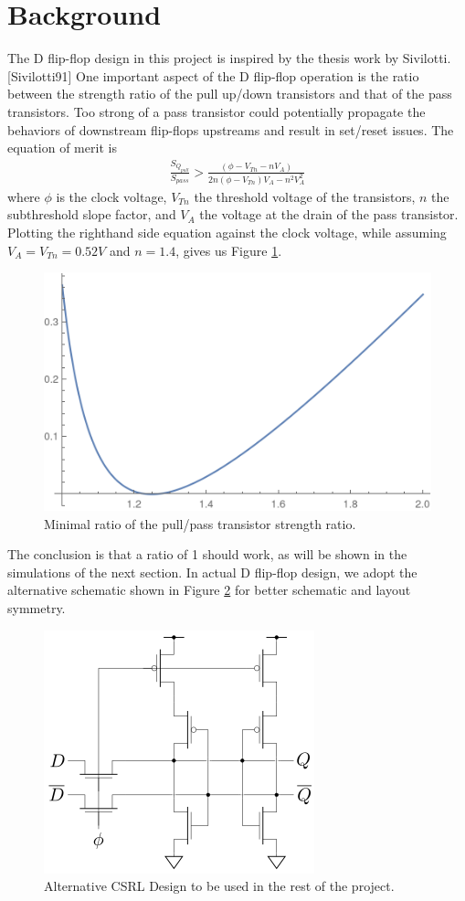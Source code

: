 \documentclass[11pt]{article}
\begin{document}
\section{Background}
    The D flip-flop design in this project is inspired by the thesis work by Sivilotti. [Sivilotti91] One important aspect of the D flip-flop operation is the ratio between the strength ratio of the pull up/down transistors and that of the pass transistors. Too strong of a pass transistor could potentially propagate the behaviors of downstream flip-flops upstreams and result in set/reset issues. The equation of merit is
    \begin{align}
        \frac{S_{Q_{pull}}}{S_{pass}} > \frac{(\phi-V_{Tn}-nV_A)}{2n(\phi-V_{Tn})V_A-n^2V_A^2}
    \end{align}
    where $\phi$ is the clock voltage, $V_{Tn}$ the threshold voltage of the transistors, $n$ the subthreshold slope factor, and $V_A$ the voltage at the drain of the pass transistor. Plotting the righthand side equation against the clock voltage, while assuming $V_A=V_{Tn}=0.52V$ and $n=1.4$, gives us Figure \ref{fig:sratio}.
    \begin{figure}[!ht]
        \centering
        \includegraphics[width=.6\linewidth]{../img/sratio.png}
        \caption{Minimal ratio of the pull/pass transistor strength ratio.}
        \label{fig:sratio}
    \end{figure}
    The conclusion is that a ratio of 1 should work, as will be shown in the simulations of the next section. In actual D flip-flop design, we adopt the alternative schematic shown in Figure \ref{fig:alt} for better schematic and layout symmetry.
    \begin{figure}[!ht]
        \centering
        \includegraphics[width=.3\linewidth]{../img/altCSRLphilatch.png}
        \caption{Alternative CSRL Design to be used in the rest of the project.}
        \label{fig:alt}
    \end{figure}
\end{document}

